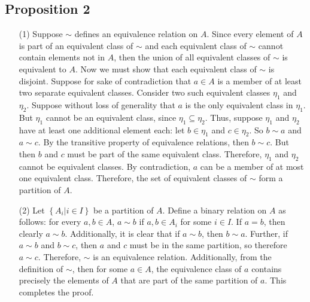\documentclass[12pt]{article}
\begin{document}
\subsection*{Proposition 2}
\begin{itemize}
\item[(1)] Suppose $\sim$ defines an equivalence relation on $A$. Since every element of $A$ is part of an equivalent class of $\sim$ and each equivalent class of $\sim$ cannot contain elements not in $A$, then the union of all equivalent classes of $\sim$ is equivalent to $A$. Now we must show that each equivalent class of $\sim$ is disjoint. Suppose for sake of contradiction that $a \in A$ is a member of at least two separate equivalent classes. Consider two such equivalent classes $\eta_1$ and $\eta_2$. Suppose without loss of generality that $a$ is the only equivalent class in $\eta_1$. But $\eta_1$ cannot be an equivalent class, since $\eta_1 \subseteq \eta_2$. Thus, suppose $\eta_1$ and $\eta_2$ have at least one additional element each: let $b \in \eta_1$ and $c \in \eta_2$. So $b \sim a$ and $a \sim c$. By the transitive property of equivalence relations, then $b \sim c$. But then $b$ and $c$ must be part of the same equivalent class. Therefore, $\eta_1$ and $\eta_2$ cannot be equivalent classes. By contradiction, $a$ can be a member of at most one equivalent class. Therefore, the set of equivalent classes of $\sim$ form a partition of $A$.
\item[(2)] Let $\left\lbrace A_i | i \in I \right\rbrace$ be a partition of $A$. Define a binary relation on $A$ as follows: for every $a, b \in A$, $a \sim b$ if $a, b \in A_i$ for some $i \in I$. If $a = b$, then clearly $a \sim b$. Additionally, it is clear that if $a \sim b$, then $b \sim a$. Further, if $a \sim b$ and $b \sim c$, then $a$ and $c$ must be in the same partition, so therefore $a \sim c$. Therefore, $\sim$ is an equivalence relation. Additionally, from the definition of $\sim$, then for some $a \in A$, the equivalence class of $a$ contains precisely the elements of $A$ that are part of the same partition of $a$. This completes the proof.
\end{itemize}
\end{document}
